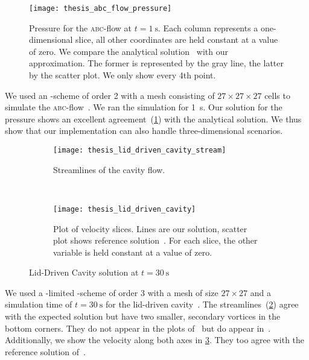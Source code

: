 \begin{figure}[htb]
  \centering
  \texttt{[image: thesis\_abc\_flow\_pressure]}
  \caption{\label{fig:abc-result}%
  Pressure for the \textsc{abc}-flow at $t=\SI{1}{\s}$.
  Each column represents a one-dimensional slice, all other coordinates are held constant at a value of zero.
  We compare the analytical solution~ with our approximation.
  The former is represented by the gray line, the latter by the scatter plot.
  We only show every 4th point.}
\end{figure}
We used an \aderdg{}-scheme of order 2 with a mesh consisting of $27 \times 27 \times 27$ cells to simulate the \textsc{abc}-flow~.
We ran the simulation for \SI{1}{\s}.
Our solution for the pressure shows an excellent agreement~(\cref{fig:abc-result}) with the analytical solution.
We thus show that our implementation can also handle three-dimensional scenarios.

\begin{figure}[htb]
  \centering
  \begin{subfigure}[t]{0.5\textwidth}
    \centering
    \texttt{[image: thesis\_lid\_driven\_cavity\_stream]}
    \caption{\label{fig:lid-driven-cavity-streamlines}%
      Streamlines of the cavity flow.}
  \end{subfigure}~%
  \begin{subfigure}[t]{0.5\textwidth}
    \centering
    \texttt{[image: thesis\_lid\_driven\_cavity]}
    \caption{\label{fig:lid-driven-cavity-result}%
      Plot of velocity slices. Lines are our solution, scatter plot shows reference solution~\cite{ghia1982high}.
      For each slice, the other variable is held constant at a value of zero.}
  \end{subfigure}
  
  \caption{\label{fig:lid-driven-cavity}%
    Lid-Driven Cavity solution at $t=\SI{30}{\s}$}
  
\end{figure}
We used a \muscl{}-limited \aderdg{}-scheme of order 3 with a mesh of size $27 \times 27$ and a simulation time of $t = \SI{30}{\s}$ for the lid-driven cavity~.
The streamlines~(\cref{fig:lid-driven-cavity-streamlines}) agree with the expected solution but have two smaller, secondary vortices in the bottom corners.
They do not appear in the plots of~\cite{dumbser2010arbitrary} but do appear in~\cite{ghia1982high}.
Additionally, we show the velocity along both axes in \cref{fig:lid-driven-cavity-result}.
They too agree with the reference solution of~\cite{ghia1982high}.

